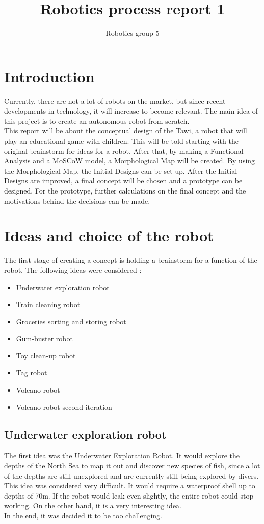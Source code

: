 \documentclass[11pt,twoside,a4paper]{report}
\begin{document}
\title{Robotics process report 1}
\author{Robotics group 5}

\tableofcontents

\chapter{Introduction}
Currently, there are not a lot of robots on the market, but since recent developments in technology, it will increase to become relevant. The main idea of this project is to create an autonomous robot from scratch. \\
This report will be about the conceptual design of the Tawi, a robot that will play an educational game with children. This will be told starting with the original brainstorm for ideas for a robot. After that, by making a Functional Analysis and a MoSCoW model, a Morphological Map will be created. By using the Morphological Map, the Initial Designs can be set up. After the Initial Designs are improved, a final concept will be chosen and a prototype can be designed. For the prototype, further calculations on the final concept and the motivations behind the decisions can be made.

\chapter{Ideas and choice of the robot}
The first stage of creating a concept is holding a brainstorm for a function of the robot. The following ideas were considered : 
\begin{itemize}
\item{Underwater exploration robot}
\item{Train cleaning robot}
\item{Groceries sorting and storing robot}
\item{Gum-buster robot}
\item{Toy clean-up robot}
\item{Tag robot}
\item{Volcano robot}
\item{Volcano robot second iteration}
\end{itemize}

\section{Underwater exploration robot}
The first idea was the Underwater Exploration Robot. It would explore the depths of the North Sea to map it out and discover new species of fish, since a lot of the depths are still unexplored and are currently still being explored by divers. \\
This idea was considered very difficult. It would require a waterproof shell up to depths of 70m. If the robot would leak even slightly, the entire robot could stop working. On the other hand, it is a very interesting idea. \\
In the end, it was decided it to be too challenging.
\end{document}
